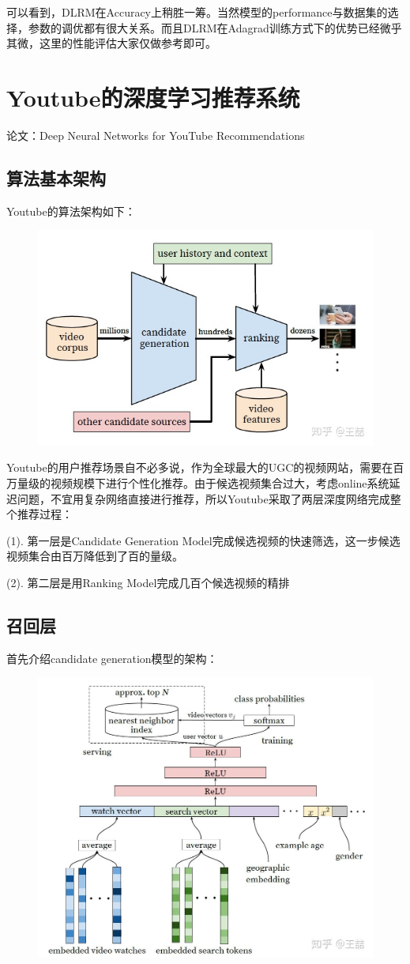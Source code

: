 \documentclass[12pt]{article}
\begin{document}
可以看到，DLRM在Accuracy上稍胜一筹。当然模型的performance与数据集的选择，参数的调优都有很大关系。而且DLRM在Adagrad训练方式下的优势已经微乎其微，这里的性能评估大家仅做参考即可。

\section{Youtube的深度学习推荐系统}
论文：Deep Neural Networks for YouTube Recommendations

\subsection{算法基本架构}
Youtube的算法架构如下：
\begin{figure}[H]
    \centering
    \includegraphics[width=.6\textwidth]{fig/YouTube_Algorithm_Architect.jpg}
\end{figure}

Youtube的用户推荐场景自不必多说，作为全球最大的UGC的视频网站，需要在百万量级的视频规模下进行个性化推荐。由于候选视频集合过大，考虑online系统延迟问题，不宜用复杂网络直接进行推荐，所以Youtube采取了两层深度网络完成整个推荐过程：

(1). 第一层是Candidate Generation Model完成候选视频的快速筛选，这一步候选视频集合由百万降低到了百的量级。

(2). 第二层是用Ranking Model完成几百个候选视频的精排

\subsection{召回层}
首先介绍candidate generation模型的架构：
\begin{figure}[H]
    \centering
    \includegraphics[width=.8\textwidth]{fig/Youtube_Candidate_Generation_Model.jpg}
\end{figure}
\end{document}
